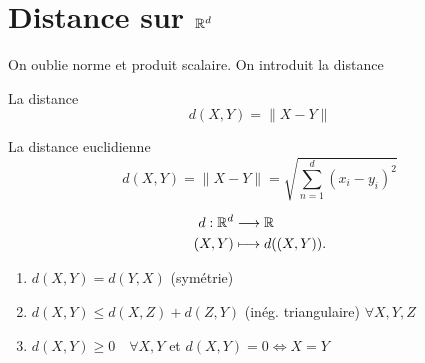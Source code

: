 \section{Distance sur $\mathbb{R}^d$}
On oublie norme et produit scalaire. On introduit la distance
\begin{definition}\label{def:distance} La distance
    \[
        d(X, Y) = \|X - Y\| 
    \] 
\end{definition}
\begin{definition} La distance euclidienne
    \[
        d(X, Y) = \|X - Y\| = \sqrt{\sum_{n=1}^{d} (x_i - y_i)^2} 
    \] 
\end{definition}
\begin{prop}
    \begin{align*}
        d: \mathbb{R}^d &\longrightarrow \mathbb{R} \\
        (X, Y) &\longmapsto d((X, Y)) 
    .\end{align*}
    \begin{enumerate}
        \item $d(X, Y) = d(Y, X)$ (symétrie)
        \item $d(X, Y) \le d(X, Z) + d(Z, Y)$ (inég. triangulaire) $\forall X, Y, Z$ 
        \item $d(X, Y) \ge 0 \quad \forall X, Y$ et $d(X, Y) = 0 \iff X = Y$ 
    \end{enumerate}
\end{prop}
